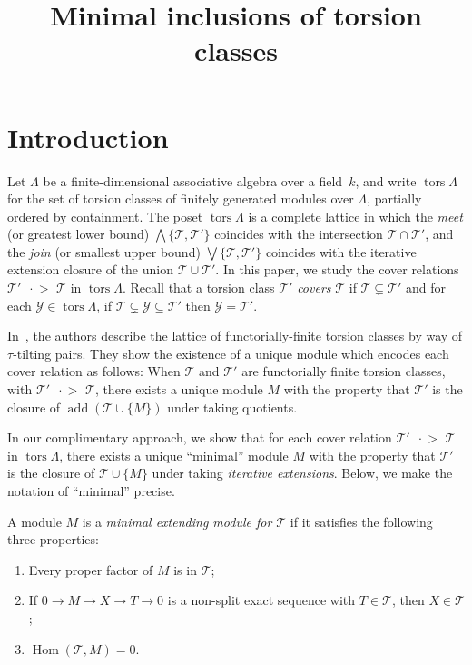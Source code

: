 \documentclass[ALCO,ThmDefs,Unicode,epreuves]{cedram}
\author{\firstname{Emily} \lastname{Barnard}}%
\author{\firstname{Andrew} \lastname{Carroll}} %
\author{\firstname{Shijie} \lastname{Zhu}} %
\title[Minimal inclusions of torsion classes]{Minimal inclusions of torsion classes}
\DeclareMathOperator{\tors}{tors}
\DeclareMathOperator{\add}{add}
\DeclareMathOperator{\Hom}{Hom}
\newcommand{\calT}{\mathcal{T}}
\newcommand{\calY}{\mathcal{Y}}
\newcommand{\covers}{{\,\,\,\cdot\!\!\!\! >\,\,}}
\renewcommand{\Join}{\bigvee}
\newcommand{\Meet}{\bigwedge}
\renewcommand{\1}{\hat{1}}
\newcommand{\0}{\hat{0}}
\newcommand{\newword}[1]{\emph{#1}}
\begin{document}
\maketitle

\section{Introduction}

Let $\Lambda$ be a
finite-dimensional associative algebra over a field~$k$, and write
$\tors \Lambda$ for the set of torsion classes of finitely generated
modules over $\Lambda$, partially ordered by containment.
The poset $\tors \Lambda$ is a complete lattice in which the \newword{meet} (or greatest lower bound) $\Meet \{\calT, \calT'\}$ coincides with the intersection $\calT \cap \calT'$, and the \newword{join} (or smallest upper bound) $\Join \{\calT, \calT'\}$ coincides with the iterative extension closure of the union $\calT\cup \calT'$.
In this paper, we study the cover relations $\calT'\covers \calT$ in $\tors \Lambda$.
Recall that a torsion class $\calT'$ \newword{covers} $\calT$ if $\calT\subsetneq \calT'$ and for each $\calY\in \tors\Lambda$, if $\calT\subsetneq \calY \subseteq \calT'$ then $\calY= \calT'$.

In~\cite{AIR}, the authors describe the lattice of functorially-finite torsion classes by way of $\tau$-tilting pairs.
They show the existence of a unique module which encodes each cover relation as follows:
When $\calT$ and $\calT'$ are functorially finite torsion classes, with $\calT'\covers \calT$,
there exists a unique module $M$ with the property that $\calT'$ is the closure of $\add(\calT \cup\{M\})$ under taking quotients.

In our complimentary approach, we show that for each cover relation $\calT'\covers \calT$ in $\tors\Lambda$, there exists a unique ``minimal'' module $M$ with the property that $\calT'$ is the closure of $\calT\cup \{M\}$ under taking \emph{iterative extensions}. 
Below, we make the notation of ``minimal'' precise. 

\begin{definition}\label{def:min-ext-module}
A module $M$ is a \newword{minimal extending module for $\calT$} if it satisfies the following three properties:
\begin{enumerate}[label={(P\arabic*)}]
 \item Every proper factor of \label{propertyone}
 $M$ is in $\calT$;
 \item If $0\rightarrow M\rightarrow X
 \rightarrow T\rightarrow 0$ is a non-split exact sequence with
 $T\in \calT$, then $X\in \calT$; \label{propertytwo}
 \item $\Hom(\calT, M)=0$. \label{propertythree}
 \end{enumerate}
\end{definition}
\end{document}
